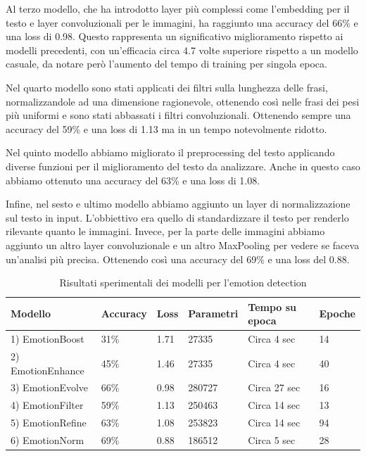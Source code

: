\documentclass{article}
\begin{document}
Al terzo modello, che ha introdotto layer più complessi come l'embedding per il testo e layer convoluzionali per le immagini, ha raggiunto una accuracy del 66\% e una loss di 0.98. Questo rappresenta un significativo miglioramento rispetto ai modelli precedenti, con un'efficacia circa 4.7 volte superiore rispetto a un modello casuale, da notare però l'aumento del tempo di training per singola epoca.

\bigskip

Nel quarto modello sono stati applicati dei filtri sulla lunghezza delle frasi, normalizzandole ad una dimensione ragionevole, ottenendo così nelle frasi dei pesi più uniformi e sono stati abbassati i filtri convoluzionali. Ottenendo sempre una accuracy del 59\% e una loss di 1.13 ma in un tempo notevolmente ridotto.

\bigskip

Nel quinto modello abbiamo migliorato il preprocessing del testo applicando diverse funzioni per il miglioramento del testo da analizzare. Anche in questo caso abbiamo ottenuto una accuracy del 63\% e una loss di 1.08.

\bigskip


Infine, nel sesto e ultimo modello abbiamo aggiunto un layer di normalizzazione sul testo in input. L'obbiettivo era quello di standardizzare il testo per renderlo rilevante quanto le immagini. Invece, per la parte delle immagini abbiamo aggiunto un altro layer convoluzionale e un altro MaxPooling per vedere se faceva un'analisi più precisa. Ottenendo così una accuracy del 69\% e una loss del $0.88$.

\begin{table}[H]
\begin{adjustwidth}{-0.5cm}{}
\centering
\begin{tabular}{@{}llllll@{}}
\toprule
\textbf{Modello} & \textbf{Accuracy} & \textbf{Loss} & \textbf{Parametri} & \textbf{Tempo su epoca} & \textbf{Epoche}  \\ \midrule
1) EmotionBoost & 31\% & 1.71 & 27335 & Circa 4 sec  & 14 \\
2) EmotionEnhance & 45\% & 1.46 & 27335 & Circa 4 sec & 40 \\
3) EmotionEvolve & 66\% & 0.98 & 280727 & Circa 27 sec & 16 \\
4) EmotionFilter & 59\% & 1.13 & 250463 & Circa 14 sec & 13 \\
5) EmotionRefine & 63\% & 1.08 & 253823 & Circa 14 sec & 94 \\
6) EmotionNorm & 69\% & 0.88 & 186512 & Circa 5 sec & 28\\ \bottomrule
\end{tabular}
\caption{Risultati sperimentali dei modelli per l'emotion detection}
\label{tab:results}
\end{adjustwidth}
\end{table}
\end{document}
